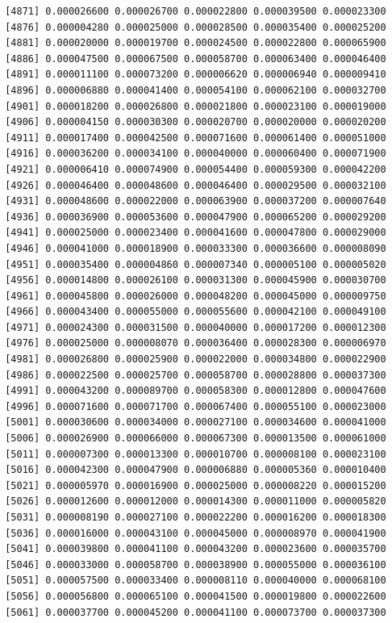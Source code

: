 \documentclass[]{article}
\begin{document}
\begin{verbatim}
 [4871] 0.000026600 0.000026700 0.000022800 0.000039500 0.000023300
 [4876] 0.000004280 0.000025000 0.000028500 0.000035400 0.000025200
 [4881] 0.000020000 0.000019700 0.000024500 0.000022800 0.000065900
 [4886] 0.000047500 0.000067500 0.000058700 0.000063400 0.000046400
 [4891] 0.000011100 0.000073200 0.000006620 0.000006940 0.000009410
 [4896] 0.000006880 0.000041400 0.000054100 0.000062100 0.000032700
 [4901] 0.000018200 0.000026800 0.000021800 0.000023100 0.000019000
 [4906] 0.000004150 0.000030300 0.000020700 0.000020000 0.000020200
 [4911] 0.000017400 0.000042500 0.000071600 0.000061400 0.000051000
 [4916] 0.000036200 0.000034100 0.000040000 0.000060400 0.000071900
 [4921] 0.000006410 0.000074900 0.000054400 0.000059300 0.000042200
 [4926] 0.000046400 0.000048600 0.000046400 0.000029500 0.000032100
 [4931] 0.000048600 0.000022000 0.000063900 0.000037200 0.000007640
 [4936] 0.000036900 0.000053600 0.000047900 0.000065200 0.000029200
 [4941] 0.000025000 0.000023400 0.000041600 0.000047800 0.000029000
 [4946] 0.000041000 0.000018900 0.000033300 0.000036600 0.000008090
 [4951] 0.000035400 0.000004860 0.000007340 0.000005100 0.000005020
 [4956] 0.000014800 0.000026100 0.000031300 0.000045900 0.000030700
 [4961] 0.000045800 0.000026000 0.000048200 0.000045000 0.000009750
 [4966] 0.000043400 0.000055000 0.000055600 0.000042100 0.000049100
 [4971] 0.000024300 0.000031500 0.000040000 0.000017200 0.000012300
 [4976] 0.000025000 0.000008070 0.000036400 0.000028300 0.000006970
 [4981] 0.000026800 0.000025900 0.000022000 0.000034800 0.000022900
 [4986] 0.000022500 0.000025700 0.000058700 0.000028800 0.000037300
 [4991] 0.000043200 0.000089700 0.000058300 0.000012800 0.000047600
 [4996] 0.000071600 0.000071700 0.000067400 0.000055100 0.000023000
 [5001] 0.000030600 0.000034000 0.000027100 0.000034600 0.000041000
 [5006] 0.000026900 0.000066000 0.000067300 0.000013500 0.000061000
 [5011] 0.000007300 0.000013300 0.000010700 0.000008100 0.000023100
 [5016] 0.000042300 0.000047900 0.000006880 0.000005360 0.000010400
 [5021] 0.000005970 0.000016900 0.000025000 0.000008220 0.000015200
 [5026] 0.000012600 0.000012000 0.000014300 0.000011000 0.000005820
 [5031] 0.000008190 0.000027100 0.000022200 0.000016200 0.000018300
 [5036] 0.000016000 0.000043100 0.000045000 0.000008970 0.000041900
 [5041] 0.000039800 0.000041100 0.000043200 0.000023600 0.000035700
 [5046] 0.000033000 0.000058700 0.000038900 0.000055000 0.000036100
 [5051] 0.000057500 0.000033400 0.000008110 0.000040000 0.000068100
 [5056] 0.000056800 0.000065100 0.000041500 0.000019800 0.000022600
 [5061] 0.000037700 0.000045200 0.000041100 0.000073700 0.000037300

\end{verbatim}
\end{document}
